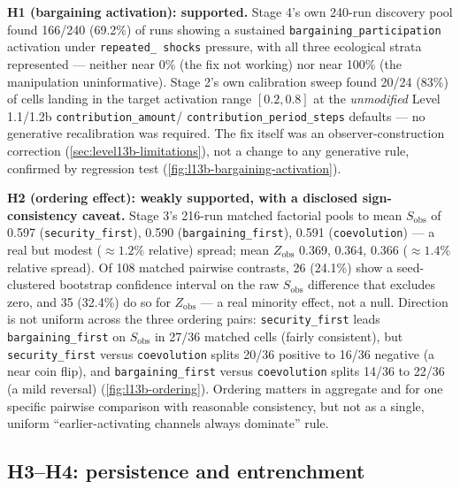 \textbf{H1 (bargaining activation): supported.} Stage 4's own 240-run
discovery pool found 166/240 (69.2\%) of runs showing a sustained
\texttt{bargaining\_participation} activation under \texttt{repeated\_%
shocks} pressure, with all three ecological strata represented ---
neither near 0\% (the fix not working) nor near 100\% (the manipulation
uninformative). Stage 2's own calibration sweep found 20/24 (83\%) of
cells landing in the target activation range $[0.2, 0.8]$ at the
\textit{unmodified} Level 1.1/1.2b \texttt{contribution\_amount}/%
\texttt{contribution\_period\_steps} defaults --- no generative
recalibration was required. The fix itself was an observer-construction
correction (\cref{sec:level13b-limitations}), not a change to any
generative rule, confirmed by regression test
(\cref{fig:l13b-bargaining-activation}).

\textbf{H2 (ordering effect): weakly supported, with a disclosed
sign-consistency caveat.} Stage 3's 216-run matched factorial pools to
mean $S_{\text{obs}}$ of 0.597 (\texttt{security\_first}), 0.590
(\texttt{bargaining\_first}), 0.591 (\texttt{coevolution}) --- a real but
modest ($\approx1.2\%$ relative) spread; mean $Z_{\text{obs}}$ 0.369,
0.364, 0.366 ($\approx1.4\%$ relative spread). Of 108 matched pairwise
contrasts, 26 (24.1\%) show a seed-clustered bootstrap confidence interval
on the raw $S_{\text{obs}}$ difference that excludes zero, and 35 (32.4\%)
do so for $Z_{\text{obs}}$ --- a real minority effect, not a null.
Direction is not uniform across the three ordering pairs:
\texttt{security\_first} leads \texttt{bargaining\_first} on
$S_{\text{obs}}$ in 27/36 matched cells (fairly consistent), but
\texttt{security\_first} versus \texttt{coevolution} splits 20/36 positive
to 16/36 negative (a near coin flip), and \texttt{bargaining\_first} versus
\texttt{coevolution} splits 14/36 to 22/36 (a mild reversal)
(\cref{fig:l13b-ordering}). Ordering matters in aggregate and for one
specific pairwise comparison with reasonable consistency, but not as a
single, uniform ``earlier-activating channels always dominate'' rule.

\subsection{H3--H4: persistence and entrenchment}
\label{sec:level13b-h3h4}

